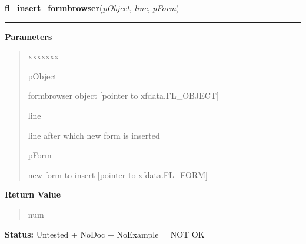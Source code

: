 \hspace{.8\funcindent}\begin{boxedminipage}{\funcwidth}

    \raggedright \textbf{fl\_insert\_formbrowser}(\textit{pObject}, \textit{line}, \textit{pForm})

    \vspace{-1.5ex}

    \rule{\textwidth}{0.5\fboxrule}
\setlength{\parskip}{2ex}
\setlength{\parskip}{1ex}
      \textbf{Parameters}
      \vspace{-1ex}

      \begin{quote}
        \begin{Ventry}{xxxxxxx}

          \item[pObject]

          formbrowser object [pointer to xfdata.FL\_OBJECT]

          \item[line]

          line after which new form is inserted

          \item[pForm]

          new form to insert [pointer to xfdata.FL\_FORM]

        \end{Ventry}

      \end{quote}

      \textbf{Return Value}
    \vspace{-1ex}

      \begin{quote}
      num

      \end{quote}

\textbf{Status:} Untested + NoDoc + NoExample = NOT OK



    \end{boxedminipage}

    \label{xformslib:library:fl_get_formbrowser_area}

    \vspace{0.5ex}

